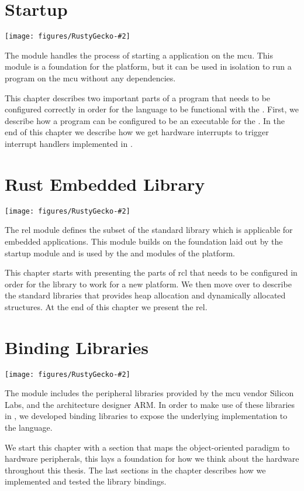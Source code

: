 
\newcommand{\corechapter}[3]{
  \chapter{#1}
  \label{chap:#2}
  \begin{center}
    \texttt{[image: figures/RustyGecko-\#2]}
  \end{center}
  \hfill \break
  \hfill \break
  \hfill \break
#3
}

\corechapter{Startup}{startup}{%
The  module handles the process of starting a {\rust} application on the \glsdesc{mcu}.
This module is a foundation for the {\rg} platform, but it can be used in isolation to run a program on the \gls{mcu} without any dependencies.

This chapter describes two important parts of a {\rust} program that needs to be configured correctly in order for the language to be functional with the {\gecko}.
First, we describe how a {\rust} program can be configured to be an executable for the {\gecko}.
In the end of this chapter we describe how we get hardware interrupts to trigger interrupt handlers implemented in {\rust}.
}


\corechapter{Rust Embedded Library}{rel}{%
The \glsdesc{rel} module defines the subset of the standard {\rust} library which is applicable for embedded applications.
This module builds on the foundation laid out by the startup module and is used by the \lib{bindings} and \lib{Application Layer} modules of the {\rg} platform.

This chapter starts with presenting the parts of \gls{rcl} that needs to be configured in order for the library to work for a new platform.
We then move over to describe the standard {\rust} libraries that provides heap allocation and dynamically allocated structures.
At the end of this chapter we present the \gls{rel}.
}



\corechapter{Binding Libraries}{bindings}{%
The  module includes the peripheral libraries provided by the \gls{mcu} vendor Silicon Labs, and the architecture designer ARM.
In order to make use of these libraries in {\rust}, we developed binding libraries to expose the underlying {\C} implementation to the {\rust} language.

We start this chapter with a section that maps the object-oriented paradigm to hardware peripherals, this lays a foundation for how we think about the hardware throughout this thesis.
The last sections in the chapter describes how we implemented and tested the library bindings.
}




